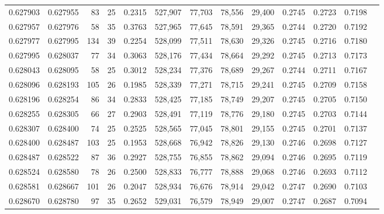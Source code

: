 \begin{tabular}{rrrrrrrrrrrrr}
0.627903 & 0.627955 &  83 &  25 &                                     0.2315 & 527,907 &  77,703 &  78,556 &  29,400 & 0.2745 & 0.2723 & 0.7198 \\
0.627957 & 0.627976 &  58 &  35 &                                     0.3763 & 527,965 &  77,645 &  78,591 &  29,365 & 0.2744 & 0.2720 & 0.7192 \\
0.627977 & 0.627995 & 134 &  39 &                                     0.2254 & 528,099 &  77,511 &  78,630 &  29,326 & 0.2745 & 0.2716 & 0.7180 \\
0.627995 & 0.628037 &  77 &  34 &                                     0.3063 & 528,176 &  77,434 &  78,664 &  29,292 & 0.2745 & 0.2713 & 0.7173 \\
0.628043 & 0.628095 &  58 &  25 &                                     0.3012 & 528,234 &  77,376 &  78,689 &  29,267 & 0.2744 & 0.2711 & 0.7167 \\
0.628096 & 0.628193 & 105 &  26 &                                     0.1985 & 528,339 &  77,271 &  78,715 &  29,241 & 0.2745 & 0.2709 & 0.7158 \\
0.628196 & 0.628254 &  86 &  34 &                                     0.2833 & 528,425 &  77,185 &  78,749 &  29,207 & 0.2745 & 0.2705 & 0.7150 \\
0.628255 & 0.628305 &  66 &  27 &                                     0.2903 & 528,491 &  77,119 &  78,776 &  29,180 & 0.2745 & 0.2703 & 0.7144 \\
0.628307 & 0.628400 &  74 &  25 &                                     0.2525 & 528,565 &  77,045 &  78,801 &  29,155 & 0.2745 & 0.2701 & 0.7137 \\
0.628400 & 0.628487 & 103 &  25 &                                     0.1953 & 528,668 &  76,942 &  78,826 &  29,130 & 0.2746 & 0.2698 & 0.7127 \\
0.628487 & 0.628522 &  87 &  36 &                                     0.2927 & 528,755 &  76,855 &  78,862 &  29,094 & 0.2746 & 0.2695 & 0.7119 \\
0.628524 & 0.628580 &  78 &  26 &                                     0.2500 & 528,833 &  76,777 &  78,888 &  29,068 & 0.2746 & 0.2693 & 0.7112 \\
0.628581 & 0.628667 & 101 &  26 &                                     0.2047 & 528,934 &  76,676 &  78,914 &  29,042 & 0.2747 & 0.2690 & 0.7103 \\
0.628670 & 0.628780 &  97 &  35 &                                     0.2652 & 529,031 &  76,579 &  78,949 &  29,007 & 0.2747 & 0.2687 & 0.7094 \\

\end{tabular}
